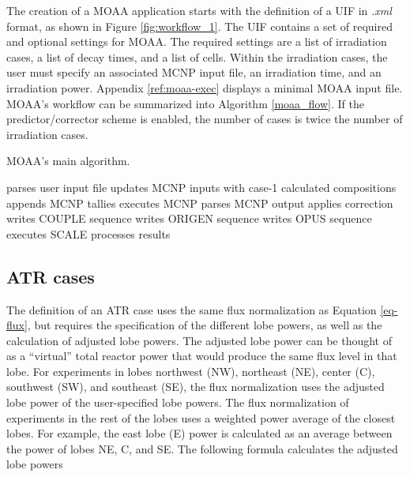 The creation of a MOAA application starts with the definition of a \gls*{UIF} in \textit{.xml} format, as shown in Figure \ref{fig:workflow_1}.
The UIF contains a set of required and optional settings for MOAA.
The required settings are a list of irradiation cases, a list of decay times, and a list of cells.
Within the irradiation cases, the user must specify an associated MCNP input file, an irradiation time, and an irradiation power.
Appendix \ref{ref:moaa-exec} displays a minimal MOAA input file.
MOAA's workflow can be summarized into Algorithm \ref{moaa_flow}.
If the predictor/corrector scheme is enabled, the number of cases is twice the number of irradiation cases.

\begin{algorithm}
  \caption{MOAA's main algorithm.}
  \label{moaa_flow}
  \begin{algorithmic}[1]
    \State parses user input file
        \State updates MCNP inputs with case-1 calculated compositions  
      \EndIf
      \State appends MCNP tallies
      \State executes MCNP
      \State parses MCNP output
        \State applies correction
      \EndIf
      \State writes COUPLE sequence
      \State writes ORIGEN sequence
      \State writes OPUS sequence
      \State executes SCALE
      \State processes results
    \EndFor
  \end{algorithmic}
\end{algorithm}



\subsection{ATR cases}
\label{sec:atr}

The definition of an ATR case uses the same flux normalization as Equation \ref{eq-flux}, but requires the specification of the different lobe powers, as well as the calculation of adjusted lobe powers.
The adjusted lobe power can be thought of as a ``virtual'' total reactor power that would produce the same flux level in that lobe.
For experiments in lobes northwest (NW), northeast (NE), center (C), southwest (SW), and southeast (SE), the flux normalization uses the adjusted lobe power of the user-specified lobe powers.
The flux normalization of experiments in the rest of the lobes uses a weighted power average of the closest lobes.
For example, the east lobe (E) power is calculated as an average between the power of lobes NE, C, and SE.
The following formula calculates the adjusted lobe powers

